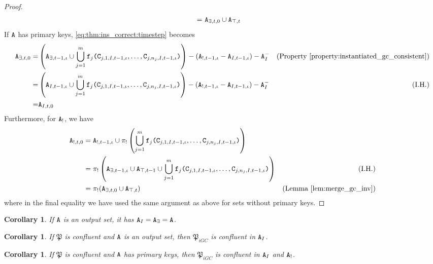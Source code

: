 \documentclass{article}
\numberwithin{equation}{section}
\newtheorem{cor}[theorem]{Corollary}
\renewcommand{\tt}[1]{\ifmmode\text{\texttt{#1}}\else\texttt{#1}\fi}
\begin{document}
\begin{proof}
\begin{align}
=&~ \tt{A}_{\exists,t,0} \cup \tt{A}_{\top,t} \nonumber
\end{align}
If $\tt{A}$ has primary keys, \eqref{eq:thm:ins_correct:timestep} becomes
\begin{align*}
\tt{A}_{\exists,t,0}
=& \left(\tt{A}_{\exists,t-1,\iota} \cup \bigcup_{j=1}^m \tt{f}_j\tt{(}\tt{C}_{j,1,I,t-1,\iota}, \dots, \tt{C}_{j,n_j,I,t-1,\iota}\tt{)}\right)
-(\tt{A}_{!,t-1,\iota} - \tt{A}_{I,t-1,\iota}) - \tt{A}_I^- & \text{(Property \ref{property:instantiated_gc_consistent})} 
\\
=& \left(\tt{A}_{I,t-1,\iota} \cup \bigcup_{j=1}^m \tt{f}_j\tt{(}\tt{C}_{j,1,I,t-1,\iota}, \dots, \tt{C}_{j,n_j,I,t-1,\iota}\tt{)}\right)
-(\tt{A}_{!,t-1,\iota} - \tt{A}_{I,t-1,\iota}) - \tt{A}_I^- & \text{(I.H.)}\\
=& \tt{A}_{I,t,0}
\end{align*}
Furthermore, for $\tt{A}_!$, we have
\begin{align*}
\tt{A}_{!,t,0}
&= \tt{A}_{!,t-1,\iota} \cup \pi_!\left(\bigcup_{j=1}^m \tt{f}_j\tt{(}\tt{C}_{j,1,I,t-1,\iota}, \dots, \tt{C}_{j,n_j,I,t-1,\iota}\tt{)}\right)\\
&= \pi_!\left(\tt{A}_{\exists,t-1,\iota} \cup \tt{A}_{\top,t-1} \cup \bigcup_{j=1}^m \tt{f}_j\tt{(}\tt{C}_{j,1,I,t-1,\iota}, \dots, \tt{C}_{j,n_j,I,t-1,\iota}\tt{)}\right) & \text{(I.H.)} \\
&= \pi_!(\tt{A}_{\exists,t,0} \cup \tt{A}_{\top,t}) & \text{(Lemma \ref{lem:merge_gc_inv})}
\end{align*}
where in the final equality we have used the same argument as above for sets without primary keys.
\end{proof}

\begin{cor}
\label{cor:instantiated_equivalence_of_output}
If $\tt{A}$ is an output set, it has $\tt{A}_I = \tt{A}_\exists = \tt{A}$.
\end{cor}

\begin{cor}
\label{cor:instantiated_confluence_of_output}
If $\mathfrak{P}$ is confluent and $\tt{A}$ is an output set, then $\mathfrak{P}_{iGC}$ is confluent in $\tt{A}_I$.
\end{cor}

\begin{cor}
\label{cor:instantiated_confluence_of_keys}
If $\mathfrak{P}$ is confluent and $\tt{A}$ has primary keys, then $\mathfrak{P}_{iGC}$ is confluent in $\tt{A}_I$ and $\tt{A}_!$.
\end{cor}
\end{document}
